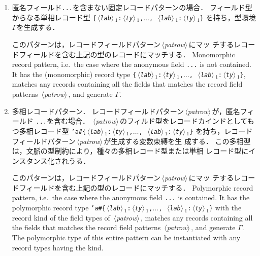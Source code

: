 \documentclass{jbook}
\newcommand{\code}[1]{\mbox{\large\tt #1}}
\newcommand{\nonterm}[1]{\mbox{$\,\langle$}{\it #1}\mbox{$\rangle\,$}}
\newcommand{\ass}{\Gamma}
\begin{document}
\begin{enumerate}
\item 
\ifjp%
匿名フィールド\verb|...|を含まない固定レコードパターンの場合．
フィールド型からなる単相レコード型
\code{\{\nonterm{lab}$_1$:\nonterm{ty}$_1$,$\ldots$,
\nonterm{lab}$_1$:\nonterm{ty}$_1$\}}
を持ち，型環境$\ass$を生成する．

	このパターンは，レコードフィールドパターン\nonterm{patrow}にマッ
チするレコードフィールドを含む上記の型のレコードにマッチする．
\else%
	Monomorphic record pattern, i.e.\ the case where the anonymous
field \verb|...| is not contained.
	It has the (monomorphic) record type
\code{\{\nonterm{lab}$_1$:\nonterm{ty}$_1$,$\ldots$,
\nonterm{lab}$_1$:\nonterm{ty}$_1$\}}, matches any records
containing all the fields that matches the record field patterns \nonterm{patrow},
and generate $\ass$.
\fi%

\item 
\ifjp%
多相レコードパターン．
	レコードフィールドパターン\nonterm{patrow}が，匿名フィールド
\verb|...|を含む場合．
	\nonterm{patrow}のフィルド型をレコードカインドとしてもつ多相レコード型
\code{'a\#\{\nonterm{lab}$_1$:\nonterm{ty}$_1$,$\ldots$,
\nonterm{lab}$_1$:\nonterm{ty}$_1$\}}
を持ち，レコードフィールドパターン\nonterm{patrow}が生成する変数束縛を生
成する．
	この多相型は，文脈の型制約により，種々の多相レコード型または単相
レコード型にインスタンス化されうる．

	このパターンは，レコードフィールドパターン\nonterm{patrow}にマッ
チするレコードフィールドを含む上記の型のレコードにマッチする．
\else%
	Polymorphic record pattern, i.e.\ the case where the anonymous
field \verb|...| is contained.
	It has the polymorphic record type 
\code{'a\#\{\nonterm{lab}$_1$:\nonterm{ty}$_1$,$\ldots$,
\nonterm{lab}$_1$:\nonterm{ty}$_1$\}}
with the record kind of the field types of \nonterm{patrow}, 
matches any records
containing all the fields that matches the record field patterns \nonterm{patrow},
and generate $\ass$.
	The polymorphic type of this entire pattern can be instantiated
with any record types having the kind.
\fi%
\end{enumerate}
\end{document}
